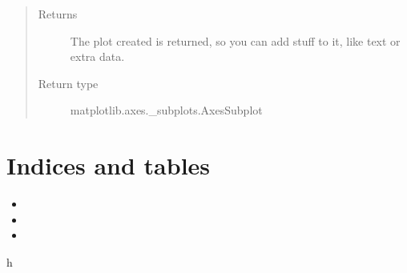 \documentclass[letterpaper,10pt,english]{sphinxmanual}
\begin{document}
\begin{fulllineitems}
\begin{quote}
\begin{description}
\begin{itemize}
\end{itemize}

\item[{Returns}] \leavevmode
The plot created is returned, so you can add stuff to it, like text or extra data.

\item[{Return type}] \leavevmode
matplotlib.axes.\_subplots.AxesSubplot

\end{description}\end{quote}

\end{fulllineitems}



\chapter{Indices and tables}
\label{\detokenize{index:indices-and-tables}}\begin{itemize}
\item {} 

\item {} 

\item {} 

\end{itemize}


\renewcommand{\indexname}{Python Module Index}
\begin{sphinxtheindex}
\def\bigletter#1{{\Large\sffamily#1}\nopagebreak\vspace{1mm}}
\bigletter{h}
\item {}
\item {}
\end{sphinxtheindex}

\renewcommand{\indexname}{Index}
\printindex
\end{document}
